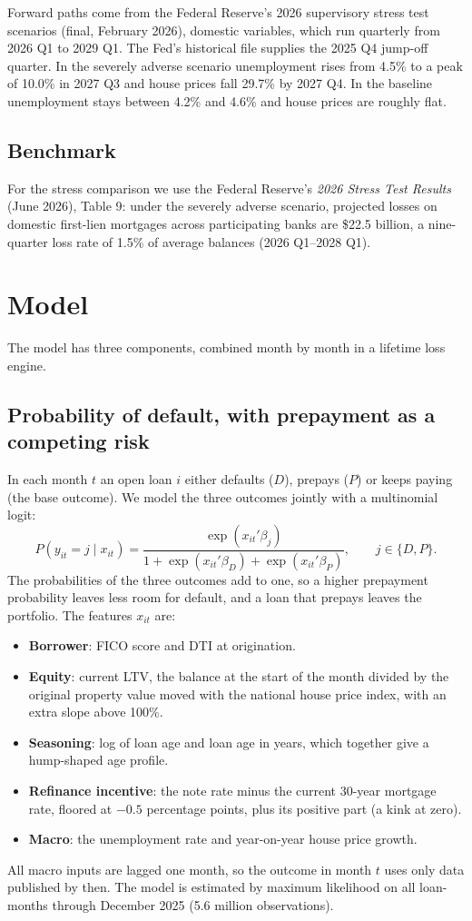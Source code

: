 \documentclass[11pt]{article}
\begin{document}
Forward paths come from the Federal Reserve's 2026 supervisory stress test scenarios (final, February 2026), domestic
variables, which run quarterly from 2026 Q1 to 2029 Q1. The Fed's historical file supplies the 2025 Q4 jump-off
quarter. In the severely adverse scenario unemployment rises from 4.5\% to a peak of 10.0\% in 2027 Q3 and house
prices fall 29.7\% by 2027 Q4. In the baseline unemployment stays between 4.2\% and 4.6\% and house prices are
roughly flat.

\subsection{Benchmark}
For the stress comparison we use the Federal Reserve's \emph{2026 Stress Test Results} (June 2026), Table 9: under
the severely adverse scenario, projected losses on domestic first-lien mortgages across participating banks are
\$22.5 billion, a nine-quarter loss rate of 1.5\% of average balances (2026 Q1--2028 Q1).

\section{Model}

The model has three components, combined month by month in a lifetime loss engine.

\subsection{Probability of default, with prepayment as a competing risk}
In each month $t$ an open loan $i$ either defaults ($D$), prepays ($P$) or keeps paying (the base outcome). We model
the three outcomes jointly with a multinomial logit:
\[
  P(y_{it} = j \mid x_{it}) = \frac{\exp(x_{it}'\beta_j)}{1 + \exp(x_{it}'\beta_D) + \exp(x_{it}'\beta_P)},
  \qquad j \in \{D, P\}.
\]
The probabilities of the three outcomes add to one, so a higher prepayment probability leaves less room for
default, and a loan that prepays leaves the portfolio. The features $x_{it}$ are:
\begin{itemize}
  \item \textbf{Borrower}: FICO score and DTI at origination.
  \item \textbf{Equity}: current LTV, the balance at the start of the month divided by the original property value
        moved with the national house price index, with an extra slope above 100\%.
  \item \textbf{Seasoning}: log of loan age and loan age in years, which together give a hump-shaped age profile.
  \item \textbf{Refinance incentive}: the note rate minus the current 30-year mortgage rate, floored at $-0.5$
        percentage points, plus its positive part (a kink at zero).
  \item \textbf{Macro}: the unemployment rate and year-on-year house price growth.
\end{itemize}
All macro inputs are lagged one month, so the outcome in month $t$ uses only data published by then. The model is
estimated by maximum likelihood on all loan-months through December 2025 (5.6 million observations).
\end{document}
